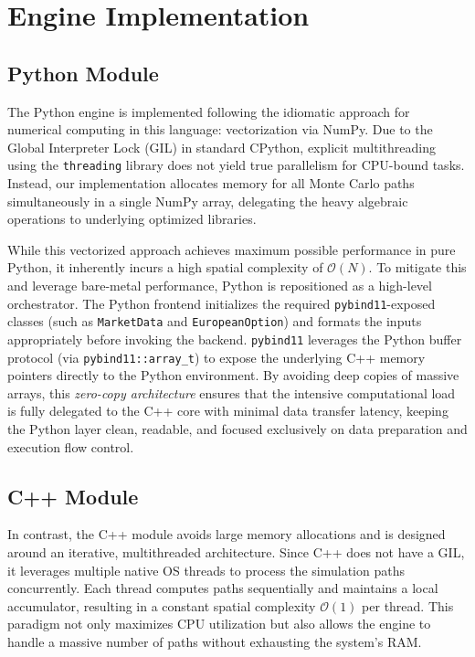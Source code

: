 \chapter{Engine Implementation}

\section{Python Module}

The Python engine is implemented following the idiomatic approach for numerical computing in this language: vectorization via NumPy. Due to the Global Interpreter Lock (GIL) in standard CPython, explicit multithreading using the \texttt{threading} library does not yield true parallelism for CPU-bound tasks. Instead, our implementation allocates memory for all Monte Carlo paths simultaneously in a single NumPy array, delegating the heavy algebraic operations to underlying optimized libraries. 

While this vectorized approach achieves maximum possible performance in pure Python, it inherently incurs a high spatial complexity of \(\mathcal{O}(N)\). To mitigate this and leverage bare-metal performance, Python is repositioned as a high-level orchestrator. The Python frontend initializes the required \texttt{pybind11}-exposed classes (such as \texttt{MarketData} and \texttt{EuropeanOption}) and formats the inputs appropriately before invoking the backend. \texttt{pybind11} leverages the Python buffer protocol (via \texttt{pybind11::array\_t}) to expose the underlying C++ memory pointers directly to the Python environment. By avoiding deep copies of massive arrays, this \textit{zero-copy architecture} ensures that the intensive computational load is fully delegated to the C++ core with minimal data transfer latency, keeping the Python layer clean, readable, and focused exclusively on data preparation and execution flow control.

\section{C++ Module}

In contrast, the C++ module avoids large memory allocations and is designed around an iterative, multithreaded architecture. Since C++ does not have a GIL, it leverages multiple native OS threads to process the simulation paths concurrently. Each thread computes paths sequentially and maintains a local accumulator, resulting in a constant spatial complexity \(\mathcal{O}(1)\) per thread. This paradigm not only maximizes CPU utilization but also allows the engine to handle a massive number of paths without exhausting the system's RAM.

